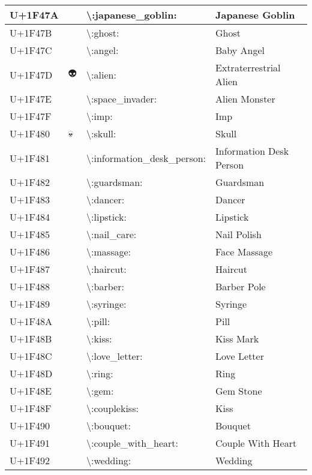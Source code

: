 \begin{table}[h]
\begin{tabulary}{\linewidth}{|L|L|L|L|}
\hline
U+1F47A & 👺 & {\textbackslash}:japanese\_goblin: & Japanese Goblin \\
\hline
U+1F47B & 👻 & {\textbackslash}:ghost: & Ghost \\
\hline
U+1F47C & 👼 & {\textbackslash}:angel: & Baby Angel \\
\hline
U+1F47D & 👽 & {\textbackslash}:alien: & Extraterrestrial Alien \\
\hline
U+1F47E & 👾 & {\textbackslash}:space\_invader: & Alien Monster \\
\hline
U+1F47F & 👿 & {\textbackslash}:imp: & Imp \\
\hline
U+1F480 & 💀 & {\textbackslash}:skull: & Skull \\
\hline
U+1F481 & 💁 & {\textbackslash}:information\_desk\_person: & Information Desk Person \\
\hline
U+1F482 & 💂 & {\textbackslash}:guardsman: & Guardsman \\
\hline
U+1F483 & 💃 & {\textbackslash}:dancer: & Dancer \\
\hline
U+1F484 & 💄 & {\textbackslash}:lipstick: & Lipstick \\
\hline
U+1F485 & 💅 & {\textbackslash}:nail\_care: & Nail Polish \\
\hline
U+1F486 & 💆 & {\textbackslash}:massage: & Face Massage \\
\hline
U+1F487 & 💇 & {\textbackslash}:haircut: & Haircut \\
\hline
U+1F488 & 💈 & {\textbackslash}:barber: & Barber Pole \\
\hline
U+1F489 & 💉 & {\textbackslash}:syringe: & Syringe \\
\hline
U+1F48A & 💊 & {\textbackslash}:pill: & Pill \\
\hline
U+1F48B & 💋 & {\textbackslash}:kiss: & Kiss Mark \\
\hline
U+1F48C & 💌 & {\textbackslash}:love\_letter: & Love Letter \\
\hline
U+1F48D & 💍 & {\textbackslash}:ring: & Ring \\
\hline
U+1F48E & 💎 & {\textbackslash}:gem: & Gem Stone \\
\hline
U+1F48F & 💏 & {\textbackslash}:couplekiss: & Kiss \\
\hline
U+1F490 & 💐 & {\textbackslash}:bouquet: & Bouquet \\
\hline
U+1F491 & 💑 & {\textbackslash}:couple\_with\_heart: & Couple With Heart \\
\hline
U+1F492 & 💒 & {\textbackslash}:wedding: & Wedding \\
\hline

\end{tabulary}
\end{table}
